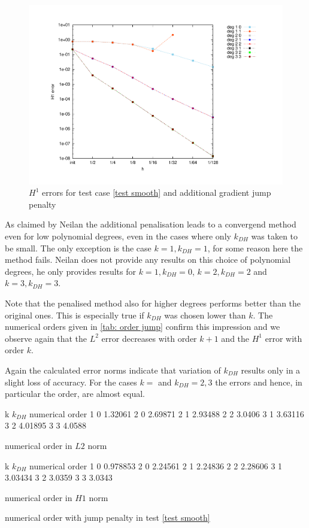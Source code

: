 \begin{figure}[H]
\centering
	\includegraphics[scale =0.45]{plots/MA1_Neilan_GradJump_h1.pdf}
	\caption{$H^1$ errors for test case \ref{test smooth} and additional gradient jump penalty}
	\label{fig: h1 errors test 1 jump}
\end{figure}

As claimed by Neilan the additional penalisation leads to a convergend method even for low polynomial degrees, even in the cases where only $k_{DH}$ was taken to be small. The only exception is the case $k=1, k_{DH}=1$, for some reason here the method fails. Neilan does not provide any results on this choice of polynomial degrees, he only provides results for $k=1, k_{DH}=0$, $k=2, k_{DH}=2$ and $k=3, k_{DH}=3$. 

Note that the penalised method also for higher degrees performs better than the original ones. This is especially true if $k_{DH}$ was chosen lower than $k$. The numerical orders given in \ref{tab: order jump} confirm this impression and we observe again that the $L^2$ error decreases with order $k+1$ and the $H^1$ error with order $k$. 

Again the calculated error norms indicate that variation of $k_{DH}$ results only in a slight loss of accuracy. For the cases $k=$ and $k_{DH} = 2,3$ the errors and hence, in particular the order, are almost equal. 


\begin{table}[H]
\centering
\begin{subtable}[b]{0.45\textwidth}
	\pgfplotstabletypeset
	{
		k $k_{DH}$ {numerical order}
		1 0 1.32061
		2 0 2.69871
		2 1 2.93488
		2 2 3.0406
		3 1 3.63116
		3 2 4.01895
		3 3 4.0588
	}
	\caption{numerical order in $L2$ norm}
	\end{subtable}
	\begin{subtable}[b]{0.45\textwidth}
	\pgfplotstabletypeset
	{
		k $k_{DH}$ {numerical order}
		1 0 0.978853
		2 0 2.24561
		2 1 2.24836
		2 2 2.28606
		3 1 3.03434
		3 2 3.0359
		3 3  3.0343
	}
	\caption{numerical order in $H1$ norm}
	\end{subtable}
	\caption{numerical order with jump penalty in test \ref{test smooth}}
\label{tab: order jump}
\end{table}

